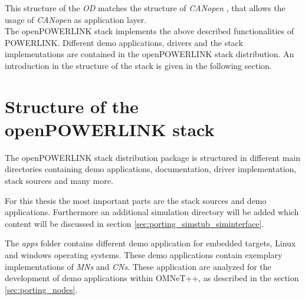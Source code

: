 This structure of the \emph{OD} matches the structure of \emph{CANopen} \cite{openpowerlink_canopen}, that allows the usage of \emph{CANopen} as application layer.
\\

The openPOWERLINK stack implements the above described functionalities of POWERLINK.
Different demo applications, drivers and the stack implementations are contained in the openPOWERLINK stack distribution.
An introduction in the structure of the stack is given in the following section.


\section{Structure of the openPOWERLINK stack}
\label{sec:oplk_structure}
The openPOWERLINK stack distribution package is structured in different main directories containing demo applications, documentation, driver implementation, stack sources and many more.

For this thesis the most important parts are the stack sources and demo applications.
Furthermore an additional simulation directory will be added which content will be discussed in section \ref{sec:porting_simstub_siminterface}.

The \emph{apps} folder contains different demo application for embedded targets, Linux and windows operating systems.
These demo applications contain exemplary implementations of \emph{MNs} and \emph{CNs}.
These application are analyzed for the development of demo applications within OMNeT++, as described in the section \ref{sec:porting_nodes}.

